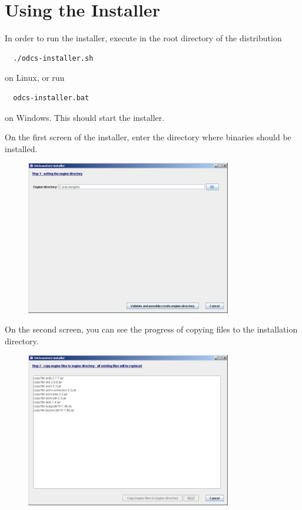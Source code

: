 \section{Using the Installer}
In order to run the installer, execute in the root directory of the distribution
\begin{verbatim}
  ./odcs-installer.sh
\end{verbatim}
on Linux, or run
\begin{verbatim}
  odcs-installer.bat
\end{verbatim}
on Windows. This should start the installer.

On the first screen of the installer, enter the directory where \odcs binaries should be installed.

\begin{figure}[!h]
    \centering
    \includegraphics[width=0.8\textwidth]{images/install-step01.png}
\end{figure}

\FloatBarrier

On the second screen, you can see the progress of copying files to the installation directory.

\begin{figure}[!h]
    \centering
    \includegraphics[width=0.8\textwidth]{images/install-step02.png}
\end{figure}

